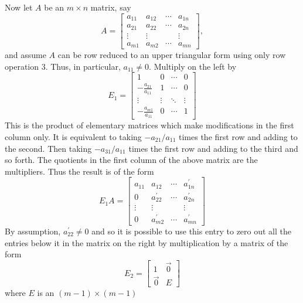 \documentclass{ximera}
\begin{document}
Now let $A$ be an $m\times n$ matrix, say
\begin{equation*}
A=
\begin{bmatrix}
a_{11} & a_{12} & \cdots & a_{1n} \\
a_{21} & a_{22} & \cdots & a_{2n} \\
\vdots & \vdots &  & \vdots \\
a_{m1} & a_{m2} & \cdots & a_{mn}
\end{bmatrix},
\end{equation*}
and assume $A$ can be row reduced to an upper triangular form using only row
operation 3. Thus, in particular, $a_{11}\neq 0$. Multiply on the left by 
\begin{equation*}
E_{1}=
\begin{bmatrix}
1 & 0 & \cdots & 0 \\
-
\frac{a_{21}}{a_{11}} & 1 & \cdots & 0 \\
\vdots & \vdots & \ddots & \vdots \\
-\frac{a_{m1}}{a_{11}} & 0 & \cdots & 1
\end{bmatrix}
\end{equation*}
This is the product of elementary matrices which make modifications in the
first column only. It is equivalent to taking $-a_{21}/a_{11}$ times the
first row and adding to the second. Then taking $-a_{31}/a_{11}$ times the
first row and adding to the third and so forth. The quotients in the first
column of the above matrix are the multipliers. Thus the result is of the
form
\begin{equation*}
E_{1}A=
\begin{bmatrix}
a_{11} & a_{12} & \cdots & a_{1n}^{\prime } \\
0 & a_{22}^{\prime } & \cdots & a_{2n}^{\prime } \\
\vdots & \vdots &  & \vdots \\
0 & a_{m2}^{\prime } & \cdots & a_{mn}^{\prime }
\end{bmatrix}
\end{equation*}
By assumption, $a_{22}^{\prime }\neq 0$ and so it is possible to use this
entry to zero out all the entries below it in the matrix on the right by
multiplication by a matrix of the form 
\begin{equation*}
E_{2}=
\begin{bmatrix}
1 & \vec{0} \\
\vec{0} & E
\end{bmatrix}
\end{equation*}
where $E$ is an $( m-1)\times ( m-1)$
\end{document}
